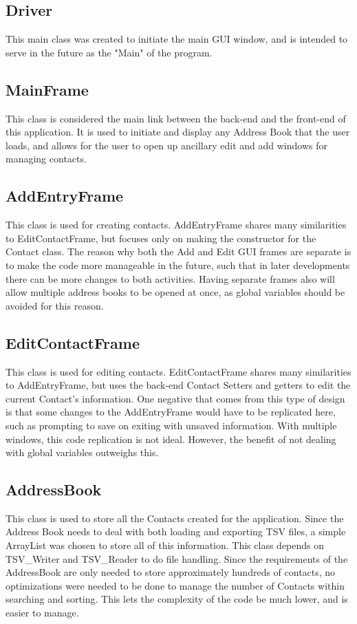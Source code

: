 \documentclass[a4paper, 11pt]{article}
\begin{document}
\subsection{Driver}
This main class was created to initiate the main GUI window, and is intended to serve in the future as the "Main" of the program. 
\subsection{MainFrame}
This class is considered the main link between the back-end and the front-end of this application. It is used to initiate and display any Address Book that the user loads, and allows for the user to open up ancillary edit and add windows for managing contacts.
\subsection{AddEntryFrame}
This class is used for creating contacts. AddEntryFrame shares many similarities to EditContactFrame, but focuses only on making the constructor for the Contact class. The reason why both the Add and Edit GUI frames are separate is to make the code more manageable in the future, such that in later developments there can be more changes to both activities. Having separate frames also will allow multiple address books to be opened at once, as global variables should be avoided for this reason.
\subsection{EditContactFrame}
This class is used for editing contacts. EditContactFrame shares many similarities to AddEntryFrame, but uses the back-end Contact Setters and getters to edit the current Contact's information. One negative that comes from this type of design is that some changes to the AddEntryFrame would have to be replicated here, such as prompting to save on exiting with unsaved information. With multiple windows, this code replication is not ideal. However, the benefit of not dealing with global variables outweighs this.
\subsection{AddressBook}
This class is used to store all the Contacts created for the application. Since the Address Book needs to deal with both loading and exporting TSV files, a simple ArrayList was chosen to store all of this information. This class depends on TSV\_Writer and TSV\_Reader to do file handling. Since the requirements of the AddressBook are only needed to store approximately hundreds of contacts, no optimizations were needed to be done to manage the number of Contacts within searching and sorting. This lets the complexity of the code be much lower, and is easier to manage.
\end{document}
